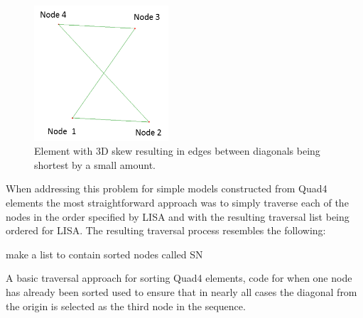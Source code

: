 \begin{figure}[!h]
  \centerline{\includegraphics[width=50mm , scale=1]{../Graphics/BadlyOrderedNodes.png}}
  \caption{Element with 3D skew resulting in edges between diagonals being shortest by a small amount.
  }
  \label{fig:h-refinementImp}
\end{figure}

\noindent
When addressing this problem for simple models constructed from Quad4 elements the most straightforward approach was to simply traverse each of the nodes in the order specified by LISA and with the resulting traversal list being ordered for LISA. The resulting traversal process resembles the following: \\
	


\begin{algorithm}[H]
\footnotesize
 make a list to contain sorted nodes called SN
 \caption{A basic traversal approach for sorting Quad4 elements, code for when one node has already been sorted used to ensure that in nearly all cases the diagonal from the origin is selected as the third node in the sequence.} 
\end{algorithm}

